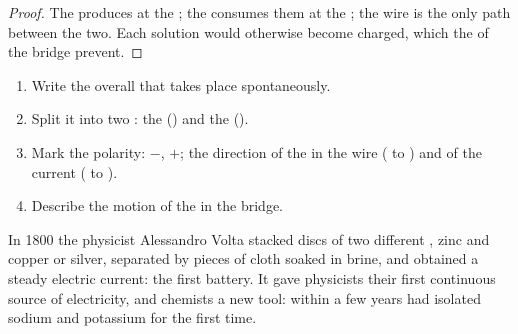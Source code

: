 \begin{proof}
The  produces  at the ; the  consumes
them at the ; the wire is the only path between the two. Each
solution would otherwise become charged, which the  of the bridge
prevent.
\end{proof}

\begin{method}\label{met:g12:cells-and-electrolysis:describe}
\begin{enumerate}
  \item Write the overall  that takes place spontaneously.
  \item Split it into two : the  () and the
         ().
  \item Mark the polarity:  $-$,  $+$; the direction of the
         in the wire ( to ) and of the current
        ( to ).
  \item Describe the motion of the  in the bridge.
\end{enumerate}
\end{method}


\begin{history}
In 1800 the physicist Alessandro Volta stacked discs of two different
, zinc and copper or silver, separated by pieces of cloth soaked in
brine, and obtained a steady electric current: the first battery. It
gave physicists their first continuous source of electricity, and
chemists a new tool: within a few years  had isolated sodium
and potassium for the first time.
\end{history}


